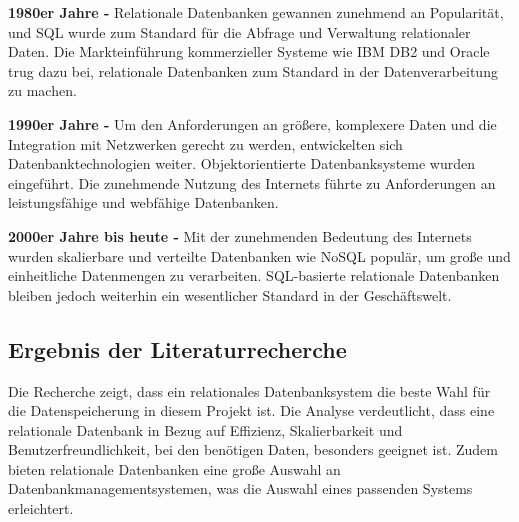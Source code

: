 \vspace{3mm}\noindent \textbf{1980er Jahre -}
Relationale Datenbanken gewannen zunehmend an Popularität, und SQL wurde zum Standard für die Abfrage und Verwaltung relationaler Daten. Die Markteinführung kommerzieller Systeme wie IBM DB2 und Oracle trug dazu bei, relationale Datenbanken zum Standard in der Datenverarbeitung zu machen. 
\cite{Paper:Geschichte1}\cite{Paper:Geschichte4}

\vspace{3mm}\noindent \textbf{1990er Jahre -}
  Um den Anforderungen an größere, komplexere Daten und die Integration mit Netzwerken gerecht zu werden, entwickelten sich Datenbanktechnologien weiter. Objektorientierte Datenbanksysteme wurden eingeführt. Die zunehmende Nutzung des Internets führte zu Anforderungen an leistungsfähige und webfähige Datenbanken.
  \cite{Paper:Geschichte4}

\vspace{3mm}\noindent \textbf{2000er Jahre bis heute -}
Mit der zunehmenden Bedeutung des Internets wurden skalierbare und verteilte Datenbanken wie NoSQL populär, um große und einheitliche Datenmengen zu verarbeiten. SQL-basierte relationale Datenbanken bleiben jedoch weiterhin ein wesentlicher Standard in der Geschäftswelt. \cite{Paper:Geschichte4}
 

\subsection{Ergebnis der Literaturrecherche}
Die Recherche zeigt, dass ein relationales Datenbanksystem die beste Wahl für die Datenspeicherung in diesem Projekt ist. Die Analyse verdeutlicht, dass eine relationale Datenbank in Bezug auf Effizienz, Skalierbarkeit und Benutzerfreundlichkeit, bei den benötigen Daten, besonders geeignet ist. Zudem bieten relationale Datenbanken eine große Auswahl an Datenbankmanagementsystemen, was die Auswahl eines passenden Systems erleichtert.
